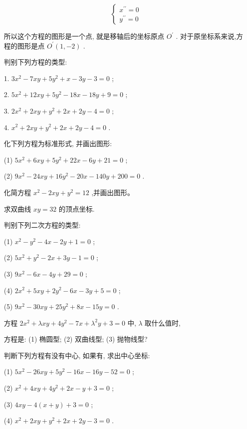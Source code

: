 \documentclass[lang=cn,newtx,10pt,scheme=chinese]{elegantbook}
\begin{document}
\[
  \left\{ \begin{array}{l} {x}^{\prime \prime } = 0 \\ {y}^{\prime \prime } = 0 \end{array}\right.
\]

所以这个方程的图形是一个点, 就是移轴后的坐标原点 \({O}^{\prime }\) . 对于原坐标系来说,方程的图形是点 \({O}^{\prime }\left( {1, - 2}\right)\) .

\begin{problemset}[练习]

\item 判别下列方程的类型:

1. \(3{x}^{2} - {7xy} + 5{y}^{2} + x - {3y} - 3 = 0\) ;

2. \(5{x}^{2} + {12xy} + 5{y}^{2} - {18x} - {18y} + 9 = 0\) ;

3. \(2{x}^{2} + {2xy} + {y}^{2} + {2x} + {2y} - 4 = 0\) ;

4. \({x}^{2} + {2xy} + {y}^{2} + {2x} + {2y} - 4 = 0\) .

\end{problemset}

\begin{problemset}[习 题 十 二]

\item 化下列方程为标准形式, 并画出图形:

(1) \(5{x}^{2} + {6xy} + 5{y}^{2} + {22x} - {6y} + {21} = 0\) ;

(2) \(9{x}^{2} - {24xy} + {16}{y}^{2} - {20x} - {140y} + {200} = 0\) .

\item 化简方程 \({x}^{2} - {2xy} + {y}^{2} = {12}\) ,并画出图形。

\item 求双曲线 \({xy} = {32}\) 的顶点坐标.

\item 判别下列二次方程的类型:

(1) \({x}^{2} - {y}^{2} - {4x} - {2y} + 1 = 0\) ;

(2) \(5{x}^{2} + {y}^{2} - {2x} + {3y} - 1 = 0\) ;

(3) \(9{x}^{2} - {6x} - {4y} + {29} = 0\) ;

(4) \(2{x}^{2} + {5xy} + 2{y}^{2} - {6x} - {3y} + 5 = 0\) ;

(5) \(9{x}^{2} - {30xy} + {25}{y}^{2} + {8x} - {15y} = 0\) .

\item 方程 \(2{x}^{2} + {\lambda xy} + 4{y}^{2} - {7x} + {\lambda }^{2}y + 3 = 0\) 中, \(\lambda\) 取什么值时,

方程是: (1) 椭圆型; (2) 双曲线型; (3) 抛物线型?

\item 判断下列方程有没有中心, 如果有, 求出中心坐标:

(1) \(5{x}^{2} - {26xy} + 5{y}^{2} - {16x} - {16y} - {52} = 0\) ;

(2) \({x}^{2} + {4xy} + 4{y}^{2} + {2x} - y + 3 = 0\) ;

(3) \({4xy} - 4\left( {x + y}\right) + 3 = 0\) ;

(4) \({x}^{2} + {2xy} + {y}^{2} + {2x} + {2y} - 3 = 0\) .

\end{problemset}
\end{document}
